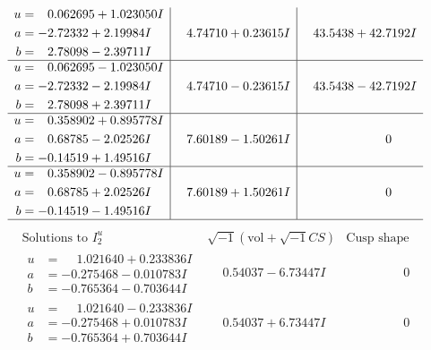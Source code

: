 \documentclass[1p]{elsarticle_modified}
\theoremstyle{definition}
\newcommand{\I}{\sqrt{-1}}
\begin{document}
$$\begin{array}{c|c|c}
\begin{aligned}
u &= \phantom{-}0.062695 + 1.023050 I \\
a &= -2.72332 + 2.19984 I \\
b &= \phantom{-}2.78098 - 2.39711 I\end{aligned}
 & \phantom{-}4.74710 + 0.23615 I & \phantom{-}43.5438 + 42.7192 I \\ \hline\begin{aligned}
u &= \phantom{-}0.062695 - 1.023050 I \\
a &= -2.72332 - 2.19984 I \\
b &= \phantom{-}2.78098 + 2.39711 I\end{aligned}
 & \phantom{-}4.74710 - 0.23615 I & \phantom{-}43.5438 - 42.7192 I \\ \hline\begin{aligned}
u &= \phantom{-}0.358902 + 0.895778 I \\
a &= \phantom{-}0.68785 - 2.02526 I \\
b &= -0.14519 + 1.49516 I\end{aligned}
 & \phantom{-}7.60189 - 1.50261 I & \phantom{-0.000000 } 0 \\ \hline\begin{aligned}
u &= \phantom{-}0.358902 - 0.895778 I \\
a &= \phantom{-}0.68785 + 2.02526 I \\
b &= -0.14519 - 1.49516 I\end{aligned}
 & \phantom{-}7.60189 + 1.50261 I & \phantom{-0.000000 } 0\\
 \hline 
 \end{array}$$\newpage$$\begin{array}{c|c|c}  
\text{Solutions to }I^u_{2}& \I (\text{vol} + \sqrt{-1}CS) & \text{Cusp shape}\\
 \hline 
\begin{aligned}
u &= \phantom{-}1.021640 + 0.233836 I \\
a &= -0.275468 - 0.010783 I \\
b &= -0.765364 - 0.703644 I\end{aligned}
 & \phantom{-}0.54037 - 6.73447 I & \phantom{-0.000000 } 0 \\ \hline\begin{aligned}
u &= \phantom{-}1.021640 - 0.233836 I \\
a &= -0.275468 + 0.010783 I \\
b &= -0.765364 + 0.703644 I\end{aligned}
 & \phantom{-}0.54037 + 6.73447 I & \phantom{-0.000000 } 0 \\ \hline\begin{aligned}

\end{aligned}
\end{array}$$
\end{document}
